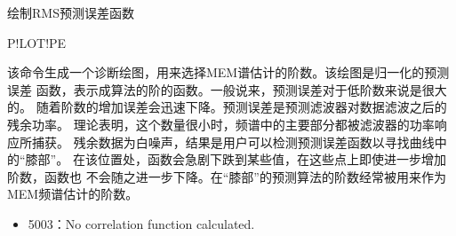 \label{spe:plotpe}

绘制RMS预测误差函数

\begin{SACSTX}
P!LOT!PE
\end{SACSTX}

该命令生成一个诊断绘图，用来选择MEM谱估计的阶数。该绘图是归一化的预测误差
函数，表示成算法的阶的函数。一般说来，预测误差对于低阶数来说是很大的。
随着阶数的增加误差会迅速下降。预测误差是预测滤波器对数据滤波之后的残余功率。
理论表明，这个数量很小时，频谱中的主要部分都被滤波器的功率响应所捕获。
残余数据为白噪声，结果是用户可以检测预测误差函数以寻找曲线中的“膝部”。
在该位置处，函数会急剧下跌到某些值，在这些点上即使进一步增加阶数，函数也
不会随之进一步下降。在“膝部”的预测算法的阶数经常被用来作为MEM频谱估计的阶数。

\begin{itemize}
\item 5003：No correlation function calculated.
\end{itemize}
